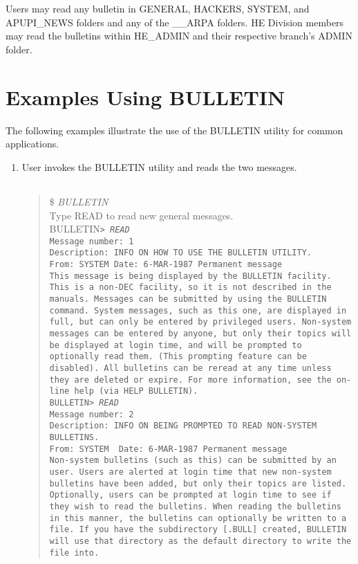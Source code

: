 Users may read any bulletin in GENERAL, HACKERS, SYSTEM, and APUPI\_NEWS
folders and any of the \_\_ARPA folders. HE Division members may read the
bulletins within HE\_ADMIN and their respective branch's ADMIN folder.
 
\section{Examples Using BULLETIN}
 
The following examples illustrate the use of the BULLETIN utility for common
applications.
\begin{enumerate}
\item User invokes the BULLETIN utility and reads the two messages.\\[2pt]
 
\smaller
\tt
\begin{quote}
\$ {\it{}BULLETIN }\\
Type READ to read new general messages.\\
BULLETIN\tt{}>{\it{} READ }\\
Message number:\mbox{   }1\\
Description: INFO ON HOW TO USE THE BULLETIN UTILITY.\\
From: SYSTEM\mbox{       }Date:  6-MAR-1987 Permanent message\\[4pt]
This message is being displayed by the BULLETIN facility.
This is a non-DEC facility, so it is not described in the manuals.
Messages can be submitted by using the BULLETIN command.  System
messages, such as this one, are displayed in full, but can only be
entered by privileged users.  Non-system messages can be entered by
anyone, but only their topics will be displayed at login time, and
will be prompted to optionally read them.  (This prompting feature
can be disabled).  All bulletins can be reread at any time unless
they are deleted or expire. For more information, see the on-line
help (via HELP BULLETIN).\\
 
BULLETIN\tt{}> {\it{}READ} \\
Message number:\mbox{   }2\\
Description: INFO ON BEING PROMPTED TO READ NON-SYSTEM BULLETINS.\\
From: SYSTEM \mbox{      }Date:  6-MAR-1987 Permanent message\\
Non-system bulletins (such as this) can be submitted by an
user. Users are alerted at login time that new non-system bulletins have
been added, but only their topics are listed.
Optionally, users can be prompted at login time to see if they wish to
read the bulletins.  When reading the bulletins in this manner, the
bulletins can optionally be written to a file. If you have the
subdirectory [.BULL] created, BULLETIN will use that directory as
the default directory to write the file into.\\
 

\end{quote}
\end{enumerate}
